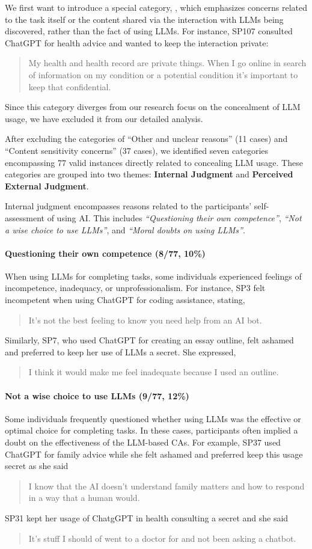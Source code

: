 We first want to introduce a special category, , which emphasizes concerns related to the task itself or the content shared via the interaction with LLMs being discovered, rather than the fact of using LLMs. 
For instance, SP107 consulted ChatGPT for health advice and wanted to keep the interaction private: ~\blockquote{My health and health record are private things. When I go online in search of information on my condition or a potential condition it's important to keep that confidential.}
Since this category diverges from our research focus on the concealment of LLM usage, we have excluded it from our detailed analysis.

After excluding the categories of ``Other and unclear reasons'' (11 cases) and ``Content sensitivity concerns'' (37 cases), we identified seven categories encompassing 77 valid instances directly related to concealing LLM usage. 
These categories are grouped into two themes: \textbf{Internal Judgment} and \textbf{Perceived External Judgment}.

Internal judgment encompasses reasons related to the participants' self-assessment of using AI. This includes \textit{``Questioning their own competence''}, \textit{``Not a wise choice to use LLMs''}, and \textit{``Moral doubts on using LLMs''}.


\paragraph{Questioning their own competence (8/77, 10\%)} 
When using LLMs for completing tasks, some individuals experienced feelings of incompetence, inadequacy, or unprofessionalism.
For instance, SP3 felt incompetent when using ChatGPT for coding assistance, stating,~\blockquote{It's not the best feeling to know you need help from an AI bot.}
Similarly, SP7, who used ChatGPT for creating an essay outline, felt ashamed and preferred to keep her use of LLMs a secret.
She expressed,~\blockquote{I think it would make me feel inadequate because I used an outline.}

\paragraph{Not a wise choice to use LLMs (9/77, 12\%)} 
Some individuals frequently questioned whether using LLMs was the effective or optimal choice for completing tasks.
In these cases, participants often implied a doubt on the effectiveness of the LLM-based CAs.
For example, SP37 used ChatGPT for family advice while she felt ashamed and preferred keep this usage secret as she said~\blockquote{I know that the AI doesn't understand family matters and how to respond in a way that a human would.}
SP31 kept her usage of ChatgGPT in health consulting a secret and she said~\blockquote{It's stuff I should of went to a doctor for and not been asking a chatbot.}

